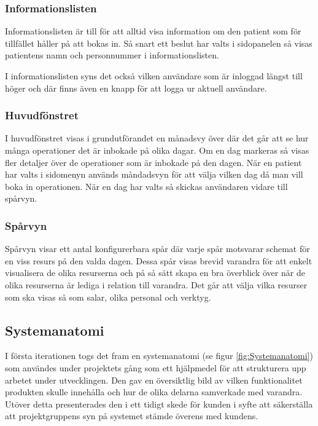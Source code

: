 \subsubsection{Informationslisten}
Informationslisten är till för att alltid visa information om den patient som för tillfället håller på att bokas in. Så snart ett beslut har valts i sidopanelen så visas patientens namn och personnummer i informationslisten.

I informationslisten syns det också vilken användare som är inloggad längst till höger och där finns även en knapp för att logga ur aktuell användare.

\subsubsection{Huvudfönstret}
I huvudfönstret visas i grundutförandet en månadsvy över där det går att se hur många operationer det är inbokade på olika dagar. Om en dag markeras så visas fler detaljer över de operationer som är inbokade på den dagen. När en patient har valts i sidomenyn används måndadsvyn för att välja vilken dag då man vill boka in operationen. När en dag har valts så skickas användaren vidare till spårvyn.

\subsubsection{Spårvyn}
Spårvyn visar ett antal konfigurerbara spår där varje spår motsvarar schemat för en viss resurs på den valda dagen. Dessa spår visas brevid varandra för att enkelt visualisera de olika resurserna och på så sätt skapa en bra överblick över när de olika resurserna är lediga i relation till varandra. Det går att välja vilka resurser som ska visas så som salar, olika personal och verktyg. 

\subsection{Systemanatomi}
I första iterationen togs det fram en systemanatomi (se figur \ref{fig:Systemanatomi}) som användes under projektets gång som ett hjälpmedel för att strukturera upp arbetet under utvecklingen. Den gav en översiktlig bild av vilken funktionalitet produkten skulle innehålla och hur de olika delarna samverkade med varandra. Utöver detta presenterades den i ett tidigt skede för kunden i syfte att säkerställa att projektgruppens syn på systemet stämde överens med kundens.

